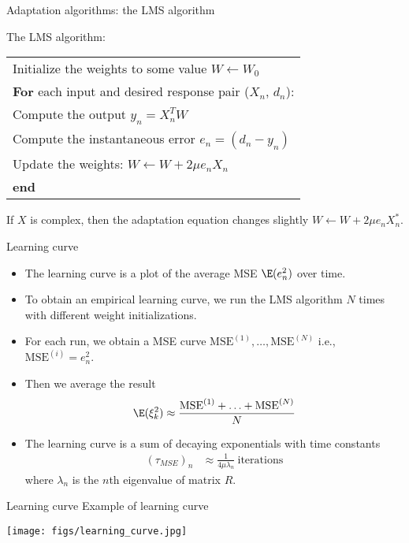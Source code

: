 \documentclass[10pt, aspectratio=169]{beamer}
\begin{document}
%
\begin{frame}{Adaptation algorithms: the LMS algorithm}

The LMS algorithm: \\
\begin{tabular}{l}
	\hline
	Initialize the weights to some value $W \leftarrow W_0$ \\
	\textbf{For} each input and desired response pair ($X_n$, $d_n$): \\
	\qquad Compute the output $y_n = X_n^TW$ \\
	\qquad Compute the instantaneous error $e_n = (d_n - y_n)$ \\
	\qquad Update the weights: $W \leftarrow W + 2\mu e_nX_n$ \\
	\textbf{end} \\
	\hline 
\end{tabular}

If $X$ is complex, then the adaptation equation changes slightly $W \leftarrow W + 2\mu e_nX_n^*$.
\end{frame}

%
\begin{frame}{Learning curve}
\begin{itemize}
	\item The learning curve is a plot of the average MSE $\E(e^2_n)$ over time.
	\item To obtain an empirical learning curve, we run the LMS algorithm $N$ times with different weight initializations.
	\item For each run, we obtain a MSE curve $\mathrm{MSE}^{(1)}, \ldots, \mathrm{MSE}^{(N)}$ i.e., $\mathrm{MSE}^{(i)} = e_n^2$.
	\item Then we average the result
	\begin{equation}
	\E(\xi_k^2) \approx \frac{\mathrm{MSE}^{(1)}+ \ldots+ \mathrm{MSE}^{(N)}}{N}
	\end{equation}

	\item The learning curve is a sum of decaying exponentials with time constants 
		\begin{align*}
		(\tau_{MSE})_n &\approx \frac{1}{4\mu\lambda_n}~\text{iterations} \tag{Steepest descent \& LMS} 
	\end{align*}
	where $\lambda_n$ is the $n$th eigenvalue of matrix $R$.	
\end{itemize}
\end{frame}

\begin{frame}{Learning curve}
Example of learning curve
\begin{center}
	\texttt{[image: figs/learning\_curve.jpg]}
\end{center}
\end{frame}
\end{document}
